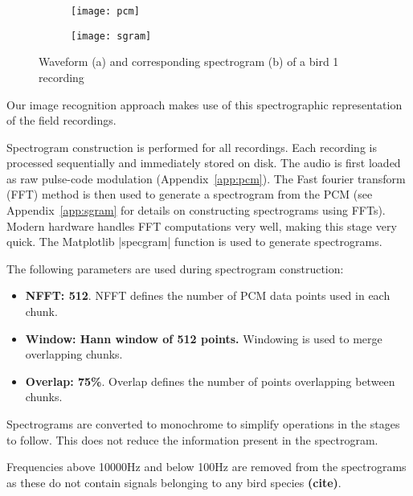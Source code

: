 \begin{figure}[!htb]
  \centering
  \begin{subfigure}[b]{1.0\textwidth}
    \texttt{[image: pcm]}
    \caption{}
  \end{subfigure}
  \begin{subfigure}[b]{1.0\textwidth}
    \texttt{[image: sgram]}
    \caption{}
  \end{subfigure}
  \caption{Waveform (a) and corresponding spectrogram (b) of a bird 1 recording}
  \label{fig:sgram_pcm}
\end{figure}

Our image recognition approach makes use of this spectrographic representation
of the field recordings.

Spectrogram construction is performed for all recordings.
Each recording is processed sequentially and immediately stored on disk.
The audio is first loaded as raw pulse-code modulation (Appendix~\ref{app:pcm}).
The Fast fourier transform (FFT) method is then used to generate a spectrogram
from the PCM (see Appendix~\ref{app:sgram} for details on constructing
spectrograms using FFTs).
Modern hardware handles FFT computations very well, making this stage very quick.
The Matplotlib |specgram| function is used to generate spectrograms.

The following parameters are used during spectrogram construction:
\begin{itemize}[noitemsep]
  \item \textbf{NFFT: 512}.
    NFFT defines the number of PCM data points used in each chunk.
  \item \textbf{Window: Hann window of 512 points.}
    Windowing is used to merge overlapping chunks.
  \item \textbf{Overlap: 75\%}.
    Overlap defines the number of points overlapping between chunks.
\end{itemize}

Spectrograms are converted to monochrome to simplify operations in the stages
to follow.
This does not reduce the information present in the spectrogram.

Frequencies above 10000Hz and below 100Hz are removed from the spectrograms as
these do not contain signals belonging to any bird species \textbf{(cite)}.
